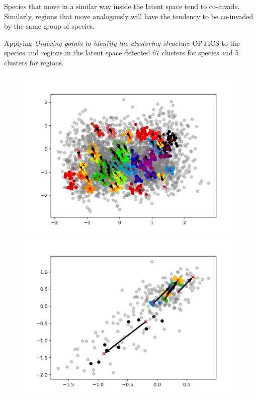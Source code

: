 \documentclass[
	11pt, %
]{beamer}
\begin{document}
\begin{frame}
Species that move in a similar way inside the latent space tend to co-invade. Similarly, regions that move analogously will have the tendency to be co-invaded by the same group of species.

\bigskip 

Applying \textit{Ordering points to identify the clustering structure} OPTICS to the species and regions in the latent space detected 67 clusters for species and 5 clusters for regions.

\end{frame}

\begin{frame}

\begin{figure}[H] 
  \begin{minipage}[b]{0.5\linewidth}
    \centering
    \includegraphics[width=\textwidth]{latentspace_cluster_species.png}
    \vspace{4ex}
  \end{minipage}%
  \begin{minipage}[b]{0.5\linewidth}
    \centering
    \includegraphics[width=\textwidth]{latentspace_cluster_region.png}

\end{minipage}
\end{figure}
\end{frame}
\end{document}
